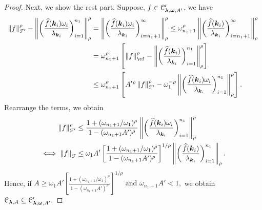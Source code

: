 \documentclass[USenglish]{article}
\theoremstyle{dgthm}
\theoremstyle{dgthm}
\theoremstyle{dgthm}
\theoremstyle{dgthm}
\theoremstyle{dgdef}
\theoremstyle{definition}
\newcommand{\hf}{\widehat{f}}
\newcommand{\norm}[2][{}]{\ensuremath{\left \lVert #2 \right \rVert}_{#1}}
\begin{document}
{\begin{proof}
Next, we show the rest part.
Suppose, $f \in {\mathcal{C}}'_{\boldsymbol{\lambda},\boldsymbol{\omega},  A'}$, we have
\begin{align*}
    \norm[\calF']{f}^\rho- \norm[\rho]{\biggl ( \frac{\hf(\bsk_i) \omega_i }{\lambda_{\bsk_i}} \biggr) _{i=1}^{n_1}}^\rho 
	& = \norm[\rho]{\biggl ( \frac{\hf(\bsk_i) \omega_i }{\lambda_{\bsk_i}} \biggr) _{i=n_1 + 1}^{\infty}}^\rho 
     \le \omega_{n_1+1}^\rho \norm[\rho]{\biggl ( \frac{\hf(\bsk_i) }{\lambda_{\bsk_i}} \biggr) _{i=n_1 + 1}^{\infty}}^\rho \\
     & = \omega_{n_1+1}^\rho \left[ \norm[\cf]{f}^\rho - \norm[\rho]{\biggl ( \frac{\hf(\bsk_i) }{\lambda_{\bsk_i}} \biggr) _{i=1}^{n_1}}^\rho \right ]\\	
     & \le \omega_{n_1+1}^\rho \left[ A'{}^\rho \norm[\calF']{f}^\rho - \omega_1^{-\rho} \norm[\rho]{\biggl ( \frac{\hf(\bsk_i) \omega_i}{\lambda_{\bsk_i}} \biggr) _{i=1}^{n_1}}^\rho \right ].
\end{align*}
Rearrange the terms, we obtain
\begin{align*}
\norm[\calF']{f}^\rho & \le \frac{1 + (\omega_{n_1+1}/\omega_1)^\rho}{1 - (\omega_{n_1+1}A')^\rho} \norm[\rho]{\biggl ( \frac{\hf(\bsk_i) \omega_i }{\lambda_{\bsk_i}} \biggr) _{i=1}^{n_1}}^\rho \\
 \iff	\norm[\calF]{f} & \le \omega_1A'\left[\frac{1 + (\omega_{n_1+1}/\omega_1)^\rho}{1 - (\omega_{n_1+1}A')^\rho}\right]^{1/\rho} \norm[\rho]{\biggl ( \frac{\hf(\bsk_i)}{\lambda_{\bsk_i}} \biggr) _{i=1}^{n_1}}.
\end{align*}
Hence, if $A \ge \omega_1A'\left[\frac{1 + (\omega_{n_1+1}/\omega_1)^\rho}{1 - (\omega_{n_1+1}A')^\rho}\right]^{1/\rho} \text{ and } \omega_{n_1+1}A' < 1,$
we obtain ${\mathcal{C}}_{\boldsymbol{\lambda}, A}
\subseteq
{\mathcal{C}}'_{\boldsymbol{\lambda}, \boldsymbol{\omega}, A'}.$
\end{proof}
}
\end{document}

